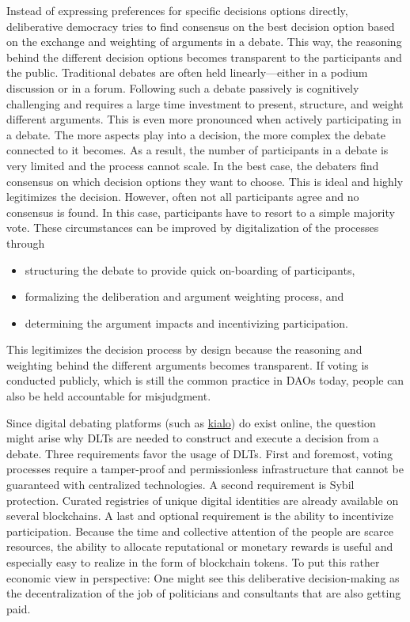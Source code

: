 \documentclass[%
aip,
amsmath,amssymb,
reprint,%
unsortedaddress,
nofootinbib
]{revtex4-2}
\begin{document}
Instead of expressing preferences for specific decisions options directly, 
deliberative democracy tries to find consensus on the best decision option based on the exchange and weighting of arguments in a debate.
This way, the reasoning behind the different decision options becomes transparent to the participants and the public.
Traditional debates are often held linearly---either in a podium discussion or in a forum.
Following such a debate passively is cognitively challenging and requires a large time investment
to present, structure, and weight different arguments.
This is even more pronounced when actively participating in a debate.
The more aspects play into a decision, the more complex the debate connected to it becomes.
As a result, the number of participants in a debate is very limited and the process cannot scale.\todo{}
In the best case, the debaters find consensus on which decision options they want to choose.
This is ideal and highly legitimizes the decision.
However, often not all participants agree and no consensus is found.
In this case, participants have to resort to a simple majority vote.
These circumstances can be improved by digitalization of the processes through
\begin{itemize}[noitemsep]
	\item structuring the debate to provide quick on-boarding of participants,
	\item formalizing the deliberation and argument weighting process, and
	\item determining the argument impacts and incentivizing participation. 
\end{itemize}

This legitimizes the decision process by design because the reasoning and weighting behind the different arguments becomes transparent.
If voting is conducted publicly, which is still the common practice in \acp{DAO} today, 
people can also be held accountable for misjudgment.

Since digital debating platforms (such as \href{https://www.kialo.com/}{kialo}) do exist online,
the question might arise why \acp{DLT} are needed to construct and execute a decision from a debate.
%
Three requirements favor the usage of \acp{DLT}.
First and foremost, voting processes require a tamper-proof and permissionless infrastructure that cannot be guaranteed with centralized technologies.
A second requirement is Sybil protection. 
Curated registries of unique digital identities are already available on several blockchains. 
A last and optional requirement is the ability to incentivize participation.
Because the time and collective attention of the people are scarce resources,
the ability to allocate reputational or monetary rewards is useful
and especially easy to realize in the form of blockchain tokens.
To put this rather economic view in perspective:
One might see this deliberative decision-making as the decentralization of the job of politicians and consultants that are also getting paid.
\end{document}
